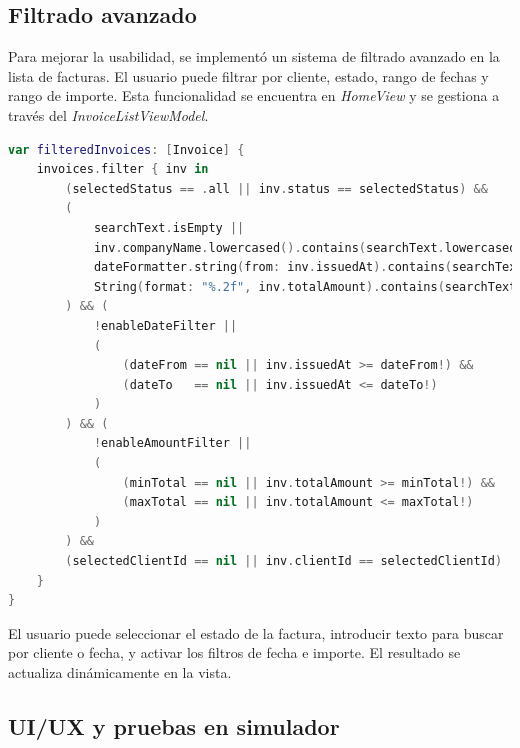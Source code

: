 \subsection{Filtrado avanzado}

\begin{large}

Para mejorar la usabilidad, se implementó un sistema de filtrado avanzado en la lista de facturas. El usuario puede filtrar por cliente, estado, rango de fechas y rango de importe. Esta funcionalidad se encuentra en \textit{HomeView} y se gestiona a través del \textit{InvoiceListViewModel}.

\begin{lstlisting}[language=swift, basicstyle=\ttfamily\small, caption={HomeView.swift - Filtrado avanzado}]
var filteredInvoices: [Invoice] {
    invoices.filter { inv in
        (selectedStatus == .all || inv.status == selectedStatus) &&
        (
            searchText.isEmpty ||
            inv.companyName.lowercased().contains(searchText.lowercased()) ||
            dateFormatter.string(from: inv.issuedAt).contains(searchText) ||
            String(format: "%.2f", inv.totalAmount).contains(searchText)
        ) && (
            !enableDateFilter ||
            (
                (dateFrom == nil || inv.issuedAt >= dateFrom!) &&
                (dateTo   == nil || inv.issuedAt <= dateTo!)
            )
        ) && (
            !enableAmountFilter ||
            (
                (minTotal == nil || inv.totalAmount >= minTotal!) &&
                (maxTotal == nil || inv.totalAmount <= maxTotal!)
            )
        ) &&
        (selectedClientId == nil || inv.clientId == selectedClientId)
    }
}
\end{lstlisting}

El usuario puede seleccionar el estado de la factura, introducir texto para buscar por cliente o fecha, y activar los filtros de fecha e importe. El resultado se actualiza dinámicamente en la vista.

\end{large}

\subsection{UI/UX y pruebas en simulador}

